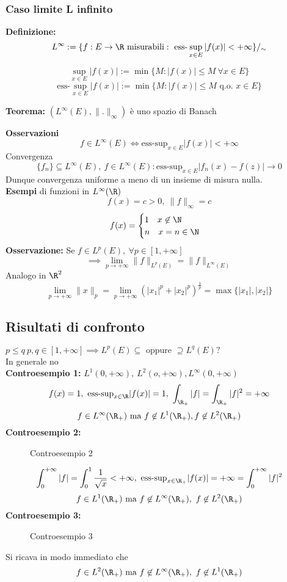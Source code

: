 \subsubsection{Caso limite L infinito}
\begin{tcolorbox}
	\textbf{Definizione:} \[L^\infty:=\{f:E\to \R\text{ misurabili}:\text{ ess-}\sup_{x\in E}|f(x)|<+\infty\}/_\sim \]

\end{tcolorbox}	
\[\sup_{x\in E}|f(x)|:=\min \{M:|f(x)|\le M\ \forall x\in E\}\]
\[\text{ess-}\sup_{x\in E}|f(x)|:=\min \{M:|f(x)|\le M\text{ q.o. } x\in E\}\]
\begin{tcolorbox}
	\textbf{Teorema:} $(L^\infty(E),\|.\|_{\infty})$ è uno spazio di Banach
\end{tcolorbox}
\textbf{Osservazioni} 
\[f\in L^\infty(E) \iff\text{ess-sup}_{x\in E}|f(x)|<+\infty\]
Convergenza
\[\{f_n\} \subseteq L^\infty(E),\ f\in L^\infty(E): \text{ess-sup}_{x\in E}|f_n(x)-f(z)|\to 0\]
Dunque convergenza uniforme a meno di un insieme di misura nulla.
\\\textbf{Esempi} di funzioni in $L^\infty(\R)$
\[f(x)=c>0,\ \|f\|_\infty=c\]
\[f(x)=\begin{cases}
	1\ \ \ x\not\in \N
	\\n\ \ \ x=n\in \N
\end{cases}
\]
\textbf{Osservazione:} Se $f\in L^p(E),\ \forall p\in[1,+\infty]$
\[\implies \lim_{p \to +\infty} \|f\|_{L^p(E)}=\|f\|_{L^\infty(E)}\]
Analogo in $\R^2$
\[\lim_{p \to +\infty} \|x\|_p=\lim_{p \to +\infty} (|x_1|^p+|x_2|^p)^{\frac{1}{p}}=\max \{|x_1|,|x_2|\}\] 
\subsection{Risultati di confronto}
$p\le q\ p,q\in[1,+\infty]\implies  L^p(E)\subseteq \text{ oppure }\supseteq L^q(E)?$
\\In generale no
\\\textbf{Controesempio 1:} $L^1(0,+\infty), \ L^2(o,+\infty),L^\infty(0,+\infty)$
\[f(x)=1,\ \text{ess-sup}_{x\in\R}|f(x)|=1,\ \int_{\R_+}^{} |f|=\int_{\R_+}^{} |f|^2=+\infty\]  
\[f\in L^{\infty}(\R_+)\text{ ma }f\not\in L^1(\R_+),f\not\in L^2(\R_+)\]
\textbf{Controesempio 2:} 
\begin{figure}[ht]
    \centering
    \caption{Controesempio 2}
    \label{fig:esempio2}
\end{figure}
\[\int_{0}^{+\infty} |f|=\int_{0}^{1} \frac{1}{\sqrt{x} }<+\infty,\ \text{ess-sup}_{x\in\R_+}|f(x)|=+\infty=\int_{0}^{+\infty}|f|^2\]
\[f\in L^1(\R_+)\text{ ma }f\not\in L^\infty(\R_+),\ f\not\in L^2(\R_+)\]
\textbf{Controesempio 3:} 
\begin{figure}[ht]
    \centering
    \caption{Controesempio 3}
    \label{fig:controesempio3}
\end{figure}
Si ricava in modo immediato che 
\[f\in L^2(\R_+)\text{ ma }f\not\in L^\infty(\R_+),\ f\not\in L^1(\R_+)\]
